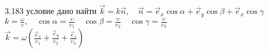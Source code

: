 \testCom
{%
	3.183
}
{%
	условие
}
{%
	дано
}
{%
	найти
}
{%
	$\vec k = k \vec n, \quad \vec n = \vec e_x \cos \alpha + \vec e_y \cos \beta + \vec e_x \cos \gamma $\\
	$k = \frac{\omega}{\upsilon}, \quad \cos \alpha = \frac{\upsilon}{\upsilon_1} \quad \cos \beta = \frac{\upsilon}{\upsilon_2} \quad \cos \gamma = \frac{\upsilon}{\upsilon_3} $\\
	$\vec k = \omega\left( \frac{\vec e_x}{\upsilon_1} + \frac{\vec e_y}{\upsilon_2} + \frac{\vec e_z}{\upsilon_3} \right)$\\
}

